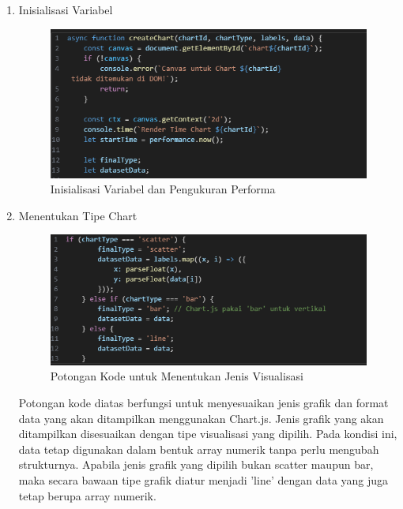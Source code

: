 \begin{enumerate}
	\item Inisialisasi Variabel
	\begin{figure}[H]
		\centering
		\includegraphics[width=0.8\linewidth]{gambar/Pembahasan/Init variabel cjss.png}
		\caption{Inisialisasi Variabel dan Pengukuran Performa}
		\label{Inisialisasi Variabel dan Pengukuran Performa}
	\end{figure}
	
	\item Menentukan Tipe Chart
	\begin{figure}[H]
		\centering
		\includegraphics[width=0.8\linewidth]{gambar/Pembahasan/type visual.png}
		\caption{Potongan Kode untuk Menentukan Jenis Visualisasi}
		\label{Potongan Kode untuk Menentukan Jenis Visualisasi}
	\end{figure}
	Potongan kode diatas berfungsi untuk menyesuaikan jenis grafik dan format data yang akan ditampilkan menggunakan Chart.js. Jenis grafik yang akan ditampilkan disesuaikan dengan tipe visualisasi yang dipilih. Pada kondisi ini, data tetap digunakan dalam bentuk array numerik tanpa perlu mengubah strukturnya. Apabila jenis grafik yang dipilih bukan scatter maupun bar, maka secara bawaan tipe grafik diatur menjadi 'line' dengan data yang juga tetap berupa array numerik. 
	

\end{enumerate}
